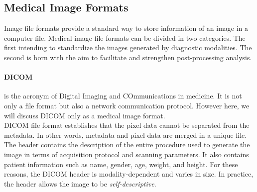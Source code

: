 \documentclass{standalone}
\begin{document}
    
\subsection{Medical Image Formats}

Image file formats provide a standard way to store information of an image in a computer file\cite{biondi}.
Medical image file formats can be divided in two categories. 
The first intending to standardize the images generated by diagnostic modalities. 
The second is born with the aim to facilitate and strengthen post-processing analysis\cite{Larobina}.

\paragraph{DICOM} is the acronym of Digital Imaging and COmmunications in medicine.
It is not only a file format but also a network communication protocol\cite{Larobina}.
However here, we will discuss DICOM only as a medical image format.\\
DICOM file format establishes that the pixel data cannot be separated from the metadata\cite{Larobina}.
In other words, metadata and pixel data are merged in a unique file.
The header contains the description of the entire procedure used to generate the image in terms of acquisition protocol and scanning parameters\cite{Larobina}. 
It also contains patient information such as name, gender, age, weight, and height. 
For these reasons, the DICOM header is modality-dependent and varies in size. 
In practice, the header allows the image to be \textit{self-descriptive}.
\end{document}
